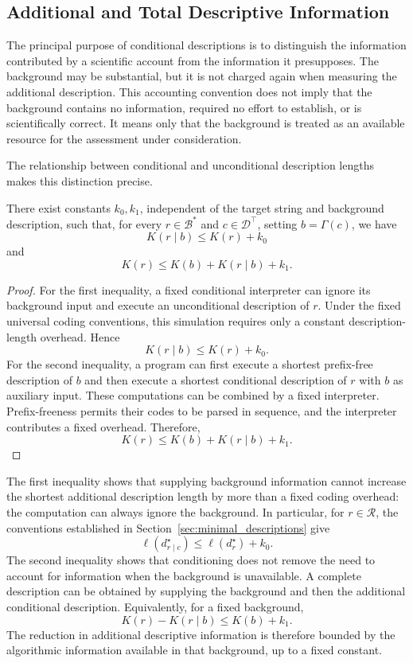 
\subsection*{Additional and Total Descriptive Information}

The principal purpose of conditional descriptions is to distinguish the information contributed by a scientific account from the information it presupposes. The background may be substantial, but it is not charged again when measuring the additional description. This accounting convention does not imply that the background contains no information, required no effort to establish, or is scientifically correct. It means only that the background is treated as an available resource for the assessment under consideration.

The relationship between conditional and unconditional description lengths makes this distinction precise.

\begin{proposition}
\label{prop:description_conditional_inequality}
There exist constants $k_0,k_1$, independent of the target string and background description, such that, for every $r\in\mathcal{B}^\ast$ and $c\in\mathcal{D}^\top$, setting $b=\Gamma(c)$, we have
\[
K(r\mid b)\leq K(r)+k_0
\]
and
\[
K(r)\leq K(b)+K(r\mid b)+k_1.
\]
\end{proposition}
\begin{proof}
For the first inequality, a fixed conditional interpreter can ignore its background input and execute an unconditional description of $r$. Under the fixed universal coding conventions, this simulation requires only a constant description-length overhead. Hence
\[
K(r\mid b)\leq K(r)+k_0.
\]
For the second inequality, a program can first execute a shortest prefix-free description of $b$ and then execute a shortest conditional description of $r$ with $b$ as auxiliary input. These computations can be combined by a fixed interpreter. Prefix-freeness permits their codes to be parsed in sequence, and the interpreter contributes a fixed overhead. Therefore,
\[
K(r)\leq K(b)+K(r\mid b)+k_1.
\]
\end{proof}

The first inequality shows that supplying background information cannot increase the shortest additional description length by more than a fixed coding overhead: the computation can always ignore the background. In particular, for $r\in\mathcal{R}$, the conventions established in Section~\ref{sec:minimal_descriptions} give
\[
\ell(d_{r\mid c}^\star) \leq \ell(d_r^\star)+k_0.
\]
The second inequality shows that conditioning does not remove the need to account for information when the background is unavailable. A complete description can be obtained by supplying the background and then the additional conditional description. Equivalently, for a fixed background,
\[
K(r)-K(r\mid b)\leq K(b)+k_1.
\]
The reduction in additional descriptive information is therefore bounded by the algorithmic information available in that background, up to a fixed constant.

